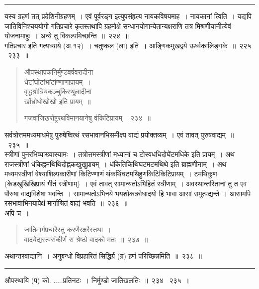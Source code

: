 \documentclass[11pt, openany]{book}
\begin{document}
\hrule
 
\vspace{2mm}
\noindent
यस्य ग्रहणं तत् प्रदेशिनीग्रहणम्~। एवं पूर्वरङ्ग इत्युपसंहृत्य नायकविषयमाह~। नायकानां त्विति~। यद्यपि  जातिविनिश्चययोगो गतिप्रचारे कृतस्तथापि ग्रहमोक्षे सन्धानयोगान्येतान्यक्षराणि तत्र मिश्रणीयानीत्येवं योजनामाहुः~। अन्ये तु विकल्पमिच्छन्ति~॥~२२४~॥\\

गतिप्रचार इति गत्यध्याये (अ.१२)~। चतुष्कल (ला) इति~। आङ्गिकमुखद्वये ऊर्ध्वकालिङ्गके~॥~२२५ \textendash\ २३३~॥

\newpage

\begin{quote}
{\na  औपस्थापकनिर्मुण्डवर्षवरादीना\\
 धेटांघोंटांभांटांण्णाणाप्रायम्~।\\
 वृद्धश्रोत्रियकञ्चुकिस्थूलादीनां\\
 खोंध्रोधोखोखो इति प्रायम्~॥

 गजवाजिखरोष्ट्ररथविमानयानेषु वंकिटिप्रायम्~।२३४~॥}
\end{quote}

{\qt सर्वत्रोत्तममध्यमाधमेषु पुरुषेष्वित्थं रसभावानभिसमीक्ष्य वाद्यं प्रयोक्तव्यम्~। एवं तावत्  पुरुषवाद्यम्~॥~२३५~॥}\\

{\qt स्त्रीणां पुनरभिव्याख्यास्यामः~। तत्रोत्तमस्त्रीणां मध्यानां च टोस्वधधिदोघेंटमधिके इति प्रायम्~। अथ राजस्त्रीणां धंकिह्नमथिथिदोह्नकखुखुप्रायम्~। धंकितिकिथिघटमटमथिथे इति ब्राह्मणीनाम्~। अथ मध्यमस्त्रीणां वेश्याशिल्पकारीणां किटिण्णाणं थंकथिंघटमथिहुणकिटिकिटिप्रायम्~। टमथिकुण (केडखुखिखिप्रायं गीतं स्त्रीणाम्)~। एवं तावत्  सामान्यतोऽभिहितं स्त्रीणाम्~। अवस्थान्तरितानां तु त एव पौरुषा वाद्यविशेषा भवन्ति~।  सामान्यतोऽभिनये भयशोकक्रोधादयो हि भावा आसां समुत्पद्यन्ते~। आसामपि  रसभावाभिनयापेक्षं मार्गाश्रितं वाद्यं भवति~॥~२३६~॥}\\

{\qt अपि च~। }

\begin{quote}
{\na  जातिमार्गप्रचारैस्तु करणैरक्षरैस्तथा~। \\
 वादयेद्यस्त्वसंकीर्णं स श्रेष्ठो वादको मतः~॥~२३७~॥}
\end{quote}

{\qt  अथान्तरवाद्यानि~। अनुबन्धो विप्रहारितं सिद्धिर्ग्र (ग्र) हणं परिच्छिन्नमिति~॥~२३८~॥}

\hrule 

\vspace{2mm}
औपस्थायि (प) को. .....प्रतिनटः~। निर्मुण्डो जातिखलतिः~॥~२३४ \textendash\ २३५~।\\
\end{document}
